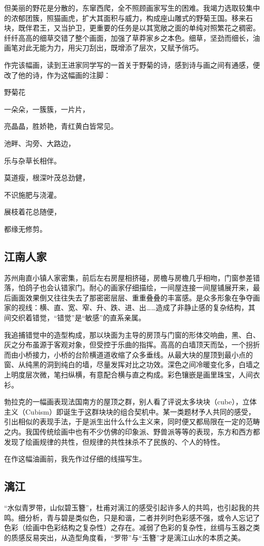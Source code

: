 \documentclass{article}
\begin{document}
但美丽的野花是分散的，东窜西爬，全不照顾画家写生的困难。我竭力选取较集中的浓郁团簇，照猫画虎，扩大其面积与威力，构成座山雕式的野菊王国。移来石块，既伴君王，又当护卫，更重要的任务是以其宽敞之面的单纯对照繁花之稠密。纤纤高高的细草交错了整个画面，加强了草莽家乡之本色。细草，坚劲而细长，油画笔对此无能为力，用尖刀刮出，既增添了层次，又赋予俏巧。

作完该幅画，读到王进家同学写的一首关于野菊的诗，感到诗与画之间有通感，便改了他的诗，作为这幅画的注脚：

野菊花

一朵朵，一簇簇，一片片，

亮晶晶，胜娇艳，青红黄白皆常见。

池畔、沟旁、大路边，

乐与杂草长相伴。

莫道瘦，根深叶茂总劲健，

不识施肥与浇灌。

展枝着花总随便，

都缘无修剪。
\subsection{江南人家}
苏州甪直小镇人家密集，前后左右房屋相挤碰，房檐与房檐几乎相吻，门窗参差错落，怕鸽子也会认错家门。耐心的画家仔细描绘，一间屋连接一间屋铺展开来，最后画面效果倒又往往失去了那密密层层、重重叠叠的丰富感。是众多形象在争夺画家的视线：横、直、宽、窄、升、跌、进、出……造成了非静止感的复杂结构，其间交织着错觉，“错觉”是“敏感”的直系亲属。

我追捕错觉中的造型构成，那以块面为主导的房顶与门窗的形体交响曲，黑、白、灰之分布虽源于客观对象，但受控于乐曲的指挥。高高的白墙顶天而坠，一个拐折而由小桥接力，小桥的台阶横道道收缩了众多垂线。从最大块的屋顶到最小点的窗、从纯黑的洞到纯白的墙，尽量发挥对比之功效。深色之间冷暖变化多，白墙之上明度层次微，笔扫纵横，有意配合横与直之构成。彩色镶嵌是画里珠宝，人间衣衫。

勃拉克的一幅画表现法国南方的屋顶之群，别人看了评说太多块块（cube），立体主义（Cubism）即诞生于这群块块的组合契机中。某一类题材予人共同的感受，引出相似的表现手法，于是派生出什么什么主义来，同时便又都局限在一定的范畴之内。我国传统绘画中也有不少仿佛的印象派、野兽派等等的表现，东方和西方都发现了绘画规律的共性，但规律的共性抹杀不了民族的、个人的特性。

在作这幅油画前，我先作过仔细的线描写生。
\subsection{漓江}
“水似青罗带，山似碧玉簪”，杜甫对漓江的感受引起许多人的共鸣，也引起我的共鸣。细分析，青与碧是类似色，只是和谐，二者并列时色彩感不强，或令人忘记了色彩（绘画中色彩结构之复杂性）之存在。减弱了色彩的复杂性，丝绸与玉器之类的质感反易突出，从造型角度看，“罗带”与“玉簪”才是漓江山水的本质之美。
\end{document}
